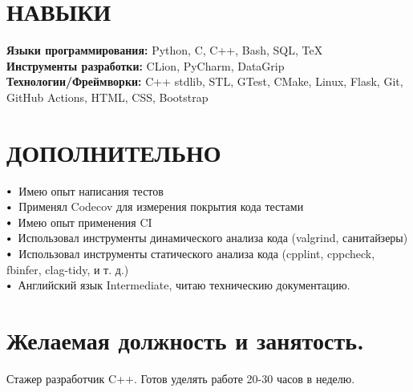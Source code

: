 \documentclass[letterpaper,11pt]{article}
\newcommand\sbullet[1][.5]{\mathbin{\vcenter{\hbox{\scalebox{#1}{$\bullet$}}}}}
\begin{document}
    
\vspace{-12pt}

\section{НАВЫКИ}
 \begin{itemize}[leftmargin=0.15in, label={}]
    \small{\item{
     \textbf{\normalsize{Языки программирования:}}{ \normalsize{Python, C, C++, Bash, SQL, TeX}} \\
     \textbf{\normalsize{Инструменты разработки:}}{ \normalsize{CLion, PyCharm, DataGrip}} \\
     \textbf{\normalsize{Технологии/Фреймворки:}}{\normalsize{ C++ stdlib, STL, GTest, CMake, Linux, Flask, Git, GitHub Actions, HTML, CSS, Bootstrap}} \\
    }}
 \end{itemize}
 \vspace{-15pt}
 
\section{ДОПОЛНИТЕЛЬНО}

$\sbullet[.75] \hspace{0.1cm}$ {{Имею опыт написания тестов}} \hspace{1.6cm} \\
$\sbullet[.75] \hspace{0.1cm}$ {{Применял Codecov для измерения покрытия кода тестами}} \hspace{2.59cm} \\
$\sbullet[.75] \hspace{0.2cm}${{Имею опыт применения CI}}\\

$\sbullet[.75] \hspace{0.2cm}${{Использовал инструменты динамического анализа кода (valgrind, санитайзеры)}} \hspace{1cm} \\
$\sbullet[.75] \hspace{0.1cm}$ {Использовал инструменты статического анализа кода (cpplint, cppcheck, fbinfer, clag-tidy, и т. д.)} \hspace{2.6cm} \\
$\sbullet[.75] \hspace{0.2cm}${{Английский язык Intermediate, читаю техническию документацию.}} \\

\section{Желаемая должность и занятость.}

Стажер разработчик C++. Готов уделять работе 20-30 часов в неделю.
\end{document}
